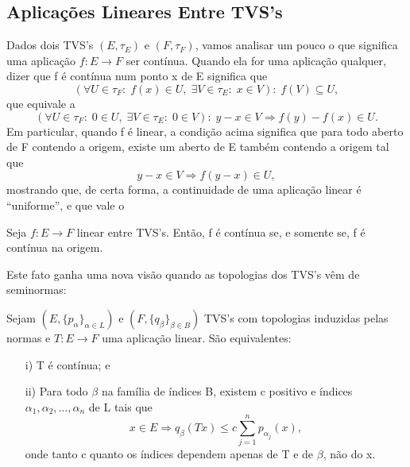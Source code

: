 \documentclass[../distribution_theory_notes.tex]{subfiles}
\begin{document}
\subsection{Aplicações Lineares Entre TVS's}
Dados dois TVS's \((E, \tau_{E})\) e \((F, \tau_{F})\), vamos analisar um pouco o que significa uma aplicação \(f:E\rightarrow F\) ser contínua. Quando ela for uma aplicação qualquer, dizer que f é contínua num ponto x de E significa que 
  \[
    (\forall U\in \tau_{F}:\; f(x)\in U,\; \exists V\in \tau_{E}:\; x\in V):\; f(V)\subseteq U,
  \]
  que equivale a 
    \[
      (\forall U\in \tau_{F}:\;0\in U,\; \exists V\in \tau_{E}:\;0\in V):\; y-x\in V \Rightarrow f(y)-f(x)\in U.
    \]
    Em particular, quando f é linear, a condição acima significa que para todo aberto de F contendo a origem, existe um aberto de E também contendo a origem tal que 
      \[
        y-x\in V \Rightarrow f(y-x)\in U,
      \]
      mostrando que, de certa forma, a continuidade de uma aplicação linear é ``uniforme'', e que vale o 
     \begin{theorem*}
       Seja \(f:E\rightarrow F\) linear entre TVS's. Então, f é contínua se, e somente se, f é contínua na origem.
     \end{theorem*}
     Este fato ganha uma nova visão quando as topologias dos TVS's vêm de seminormas: 
    \begin{prop*}
      Sejam \((E, \{p_{\alpha }\}_{\alpha \in L})\) e \((F, \{q_{\beta }\}_{\beta \in B})\) TVS's com topologias induzidas pelas normas e \(T:E\rightarrow F\) uma aplicação linear. São equivalentes: 
     \begin{itemize}
       \item[i)] T é contínua; e 
         \item[ii)] Para todo \(\beta \) na família de índices B, existem c positivo e índices \(\alpha_1, \alpha_2,\dotsc , \alpha_{n}\) de L tais que 
           \[
            x\in E \Rightarrow q_{\beta }(Tx)\leq c \sum\limits_{j=1}^{n}p_{\alpha_{j}}(x),
           \]
           onde tanto c quanto os índices dependem apenas de T e de \(\beta\), não do x.
     \end{itemize}
    \end{prop*}
\end{document}
